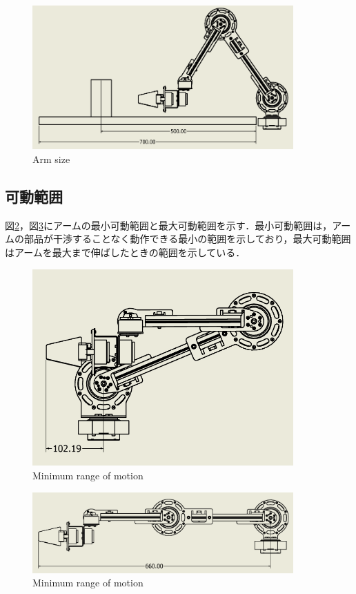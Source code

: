 \begin{figure}[htbp]
  \centering
  \includegraphics[width=10cm]{images/design/hikaku.png}
  \caption{Arm size}
  \label{fig:arm_size}
\end{figure}

\clearpage

\subsection{可動範囲}
図\ref{fig:arm_short}，図\ref{fig:arm_long}にアームの最小可動範囲と最大可動範囲を示す．最小可動範囲は，アームの部品が干渉することなく動作できる最小の範囲を示しており，最大可動範囲はアームを最大まで伸ばしたときの範囲を示している．

\begin{figure}[htbp]
  \centering
  \includegraphics[width=10cm]{images/design/arm_short.png}
  \caption{Minimum range of motion}
  \label{fig:arm_short}
\end{figure}

\begin{figure}[htbp]
  \centering
  \includegraphics[width=10cm]{images/design/arm_long.png}
  \caption{Minimum range of motion}
  \label{fig:arm_long}
\end{figure}

